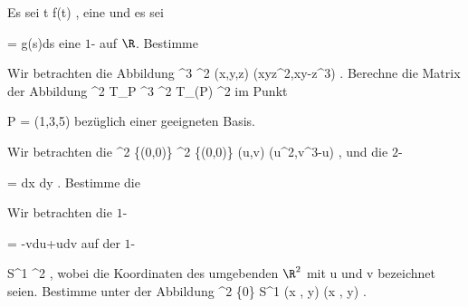 {}
{

Es sei
 {\R} {\R
} { t } {f(t)
} {,}
eine
und es sei

\mavergleichskette
{\vergleichskette
{ \omega
}
{ = }{ g(s)ds
}
{  }{
}
{    }{
}
{   }{
}
}
{}{}{}
eine
$1$-
auf $\R$. Bestimme

}
{} {}

{}
{

Wir betrachten die Abbildung
\maabbeledisp {\varphi} {\R^3} {\R^2
} {(x,y,z)} {(xyz^2,xy-z^3)
} {.}
Berechne die Matrix der Abbildung
 { \bigwedge^2 T_P \R^3 } { \bigwedge^2 T_{\varphi(P)}  \R^2
} {}
im Punkt

\mavergleichskette
{\vergleichskette
{ P
}
{ = }{ (1,3,5)
}
{  }{
}
{    }{
}
{   }{
}
}
{}{}{}
bezüglich einer geeigneten Basis.

}
{} {}

{}
{

Wir betrachten die
\maabbeledisp {\varphi} {\R^2 \setminus \{(0,0)\}} {\R^2 \setminus \{(0,0)\}
} {(u,v)} {(u^2,v^3-u)
} {,}
und die
$2$-

\mavergleichskettedisp
{\vergleichskette
{ \omega
}
{ =} { {  } dx \wedge dy
}
{ } {
}
{ } {
}
{ } {
}
}
{}{}{.}
Bestimme die


}
{} {}

{}
{

Wir betrachten die
$1$-

\mavergleichskettedisp
{\vergleichskette
{ \omega
}
{ =} { -vdu+udv
}
{ } {
}
{ } {
}
{ } {
}
}
{}{}{}
auf der
$1$-

\mavergleichskette
{\vergleichskette
{ S^1
}
{ \subset }{ \R^2
}
{  }{
}
{    }{
}
{   }{
}
}
{}{}{,}
wobei die Koordinaten des umgebenden $\R^2$ mit
\mathkor {} {u} {und} {v} {}
bezeichnet seien. Bestimme
\mathl{\pi^* \omega}{} unter der
Abbildung
\maabbeledisp {\pi} {\R^2 \setminus \{0\}} { S^{1}
} {(x , y) } { {  } (x , y)
} {.}

}
{} {}

